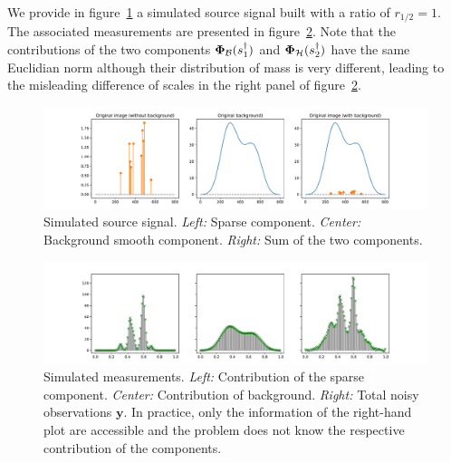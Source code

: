 \documentclass[12pt]{article}
\begin{document}
            We provide in figure~\ref{fig:simple:source} a simulated source signal built with a ratio of $r_{1/2} = 1$. 
            The associated measurements are presented in figure~\ref{fig:simple:measurements}. Note that the contributions of the two components $\bm{\Phi}_\mathcal{B}(s_1^\dagger)$ and $\bm{\Phi}_\mathcal{H}(s_2^\dagger)$ have the same Euclidian norm although their distribution of mass is very different, leading to the misleading difference of scales in the right panel of figure~\ref{fig:simple:measurements}. %
    
            \begin{figure}[t]
                \centering
                \includegraphics[width=\linewidth]{figures/simple_reco/gt.pdf}        
                \caption{Simulated source signal. \textit{Left:} Sparse component. \textit{Center:} Background smooth component. \textit{Right:} Sum of the two components. }
                \label{fig:simple:source}
            \end{figure}
        
            \begin{figure}[t]
                \centering
                \includegraphics[width=\linewidth]{figures/simple_reco/measurements.pdf}        
                \caption{Simulated measurements. \textit{Left:} Contribution of the sparse component. \textit{Center:} Contribution of background. \textit{Right:} Total noisy observations $\bm{y}$. In practice, only the information of the right-hand plot are accessible and the problem does not know the respective contribution of the components.}
                \label{fig:simple:measurements}
            \end{figure}
\end{document}
